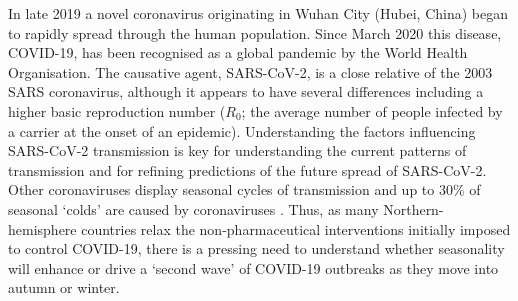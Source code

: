 \documentclass[12pt,english,a4paper]{article}
\newcommand{\virus}{SARS-CoV-2\xspace}
\newcommand{\disease}{COVID-19\xspace}
\newcommand{\RO}{$R_0$\xspace}
\begin{document}
In late 2019 a novel coronavirus originating in 
Wuhan City (Hubei, China)\cite{Zhou2020} began to rapidly spread through the human population. Since March 2020 this disease, \disease, has been recognised as a global pandemic by the World Health Organisation\cite{WHO2020}. 
The causative agent, SARS-CoV-2, is a close relative of the 2003 SARS coronavirus\cite{Zhou2020}, although it appears to have several differences including a higher basic reproduction number\cite{Liu2020} (\RO; the average number of people infected by a carrier at the onset of an epidemic). Understanding the factors influencing \virus transmission is key for understanding the current patterns of transmission and for refining predictions of the future spread of \virus. Other coronaviruses display seasonal cycles of transmission and up to 30\% of seasonal `colds' are caused by coronaviruses \cite{Mesel-Lemoine2012}.
Thus, as many Northern-hemisphere countries relax the non-pharmaceutical interventions initially imposed to control \disease, there is a pressing need to understand whether seasonality will enhance or drive a `second wave' of \disease outbreaks as they move into autumn or winter\cite{Smit2020}.
\end{document}
